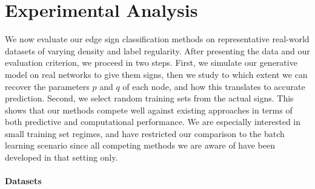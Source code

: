 \section{Experimental Analysis}\label{s:exp}

We now evaluate our edge sign classification methods on representative real-world datasets of
varying density and label regularity.
After presenting the data and our evaluation criterion, we proceed in two steps. First, we simulate
our generative model on real networks to give them signs, then we study to which extent we can recover
the parameters $p$ and $q$ of each node, and how this translates to accurate prediction. Second, we
select random training sets from the actual signs.
This shows that our methods compete well against
existing approaches in terms of both predictive and computational performance. We are especially
interested in small training set regimes, and have restricted our comparison to the batch learning
scenario since all competing methods we are aware of have been developed in that setting only.

\paragraph{Datasets}

